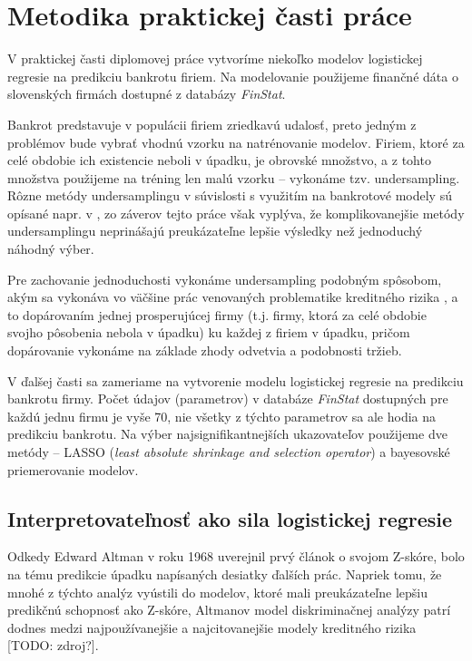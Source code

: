 \section{Metodika praktickej časti práce}
\label{metodika}

V praktickej časti diplomovej práce vytvoríme niekoľko modelov logistickej regresie na predikciu bankrotu firiem.
Na modelovanie použijeme finančné dáta o slovenských firmách dostupné z databázy \emph{FinStat}.

Bankrot predstavuje v populácii firiem zriedkavú udalosť, preto jedným z problémov bude vybrať vhodnú vzorku na natrénovanie modelov.
Firiem, ktoré za celé obdobie ich existencie neboli v úpadku, je obrovské množstvo, a z tohto množstva použijeme na tréning len malú vzorku – vykonáme tzv. undersampling.
Rôzne metódy undersamplingu v súvislosti s využitím na bankrotové modely sú opísané napr. v \cite{protopapadakis},
zo záverov tejto práce však vyplýva, že komplikovanejšie metódy undersamplingu neprinášajú preukázateľne lepšie výsledky než jednoduchý náhodný výber.

Pre zachovanie jednoduchosti vykonáme undersampling podobným spôsobom, akým sa vykonáva vo väčšine prác venovaných problematike kreditného rizika \cite{zmijewski},
a to dopárovaním jednej prosperujúcej firmy (t.j. firmy, ktorá za celé obdobie svojho pôsobenia nebola v úpadku) ku každej z firiem v úpadku,
pričom dopárovanie vykonáme na základe zhody odvetvia a podobnosti tržieb.

V ďalšej časti sa zameriame na vytvorenie modelu logistickej regresie na predikciu bankrotu firmy.
Počet údajov (parametrov) v databáze \emph{FinStat} dostupných pre každú jednu firmu je vyše 70, nie všetky z týchto parametrov sa ale hodia na predikciu bankrotu.
Na výber najsignifikantnejších ukazovateľov použijeme dve metódy – LASSO (\emph{least absolute shrinkage and selection operator}) a bayesovské priemerovanie modelov.

\subsection{Interpretovateľnosť ako sila logistickej regresie} \label{model interpretability}

Odkedy Edward Altman v roku 1968 uverejnil prvý článok o svojom Z-skóre, bolo na tému predikcie úpadku napísaných desiatky ďalších prác.
Napriek tomu, že mnohé z týchto analýz vyústili do modelov, ktoré mali preukázateľne lepšiu predikčnú schopnosť ako Z-skóre,
Altmanov model diskriminačnej analýzy patrí dodnes medzi najpoužívanejšie a najcitovanejšie modely kreditného rizika [TODO: zdroj?].

